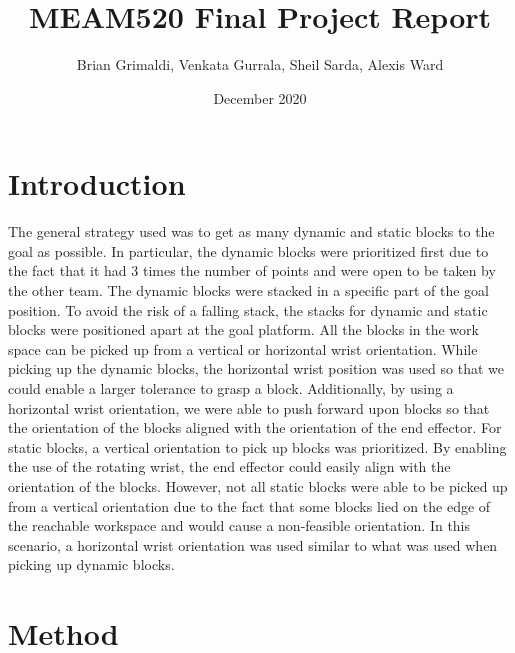 \documentclass{article}
\begin{document}
\title{MEAM520 Final Project Report}
\author{Brian Grimaldi, Venkata Gurrala, Sheil Sarda, Alexis Ward}
\date{December 2020}


\maketitle


\section{Introduction}

The general strategy used was to get as many dynamic and static blocks to the goal as possible. In particular, the dynamic blocks were prioritized first due to the fact that it had 3 times the number of points and were open to be taken by the other team. The dynamic blocks were stacked in a specific part of the goal position. To avoid the risk of a falling stack, the stacks for dynamic and static blocks were positioned apart at the goal platform. All the blocks in the work space can be picked up from a vertical or horizontal wrist orientation. While picking up the dynamic blocks, the horizontal wrist position was used so that we could enable a larger tolerance to grasp a block. Additionally, by using a horizontal wrist orientation, we were able to push forward upon blocks so that the orientation of the blocks aligned with the orientation of the end effector. For static blocks, a vertical orientation to pick up blocks was prioritized. By enabling the use of the rotating wrist, the end effector could easily align with the orientation of the blocks. However, not all static blocks were able to be picked up from a vertical orientation due to the fact that some blocks lied on the edge of the reachable workspace and would cause a non-feasible orientation. In this scenario, a horizontal wrist orientation was used similar to what was used when picking up dynamic blocks.

\section{Method}
\end{document}
